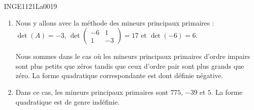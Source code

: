 

\begin{corrige}{INGE1121La0019}

	\begin{enumerate}

		\item
					
		Nous y allons avec la méthode des mineurs principaux primaires : $\det(A)=-3$, $\det\begin{pmatrix}
			-6	&	1	\\ 
			1	&	-3	
		\end{pmatrix}=17$ et $\det(-6)=6$.
	
		Nous sommes dans le cas où les mineurs principaux primaires d'ordre impairs sont plus petits que zéros tandis que ceux d'ordre pair sont plus grands que zéro. La forme quadratique correspondante est dont définie négative.
	
	\item
		Dans ce cas, les mineurs principaux primaires sont $775$, $-39$ et $5$. La forme quadratique est de genre indéfinie.

	\end{enumerate}

\end{corrige}
